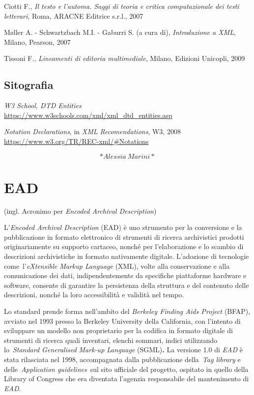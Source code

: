 \documentclass[
  b5paper,
  twoside,
  12pt,
  chapterprefix=false,
  bibliography=totocnumbered,
  parskip=false]{scrbook}
\begin{document}
Ciotti F., \emph{Il testo e l'automa. Saggi di teoria e critica
computazionale dei testi letterari}, Roma, ARACNE Editrice s.r.l., 2007

Møller A. - Schwartzbach M.I. - Gaburri S. (a cura di), \emph{Introduzione a
XML}, Milano, Pearson, 2007

Tissoni F., \emph{Lineamenti di editoria multimediale}, Milano, Edizioni
Unicopli, 2009

\hypertarget{sitografia-10}{%
\section*{Sitografia}\label{sitografia-10}}

\emph{W3 School, DTD Entities}
\url{https://www.w3schools.com/xml/xml_dtd_entities.asp}

\emph{Notation Declarations}, in \emph{XML Recomendations}, W3, 2008
\url{https://www.w3.org/TR/REC-xml/\#Notations}

\[*Alessia~Marini*\]

\hypertarget{ead}{%
\chapter{EAD}\label{ead}}

(ingl. Acronimo per \emph{Encoded Archival Description})

L'\emph{Encoded Archival Description} (EAD) è uno strumento per la
conversione e la pubblicazione in formato elettronico di strumenti di
ricerca archivistici prodotti originariamente su supporto cartaceo,
nonché per l'elaborazione e lo scambio di descrizioni archivistiche in
formato nativamente digitale. L'adozione di tecnologie
come~l'\emph{eXtensible Markup Language} (XML), volte alla conservazione e
alla comunicazione dei dati, indipendentemente da specifiche piattaforme
hardware e software, consente di garantire la persistenza della
struttura e del contenuto delle descrizioni, nonché la loro
accessibilità e validità nel tempo.

Lo standard prende forma nell'ambito del \emph{Berkeley Finding Aids
Project} (BFAP), avviato nel 1993 presso la Berkeley University della
California, con l'intento di sviluppare un modello non proprietario per
la codifica in formato digitale di strumenti di ricerca quali inventari,
elenchi sommari, indici utilizzando lo~\emph{Standard Generalised Mark-up
Language} (SGML)\textbf{.} La versione 1.0 di \emph{EAD} è stata rilasciata nel
1998, accompagnata dalla pubblicazione della~\emph{Tag library} e
delle~\emph{Application guidelines}~sul sito ufficiale del progetto, ospitato
in quello della Library of Congress che era diventata l'agenzia
responsabile del mantenimento di \emph{EAD}.
\end{document}
